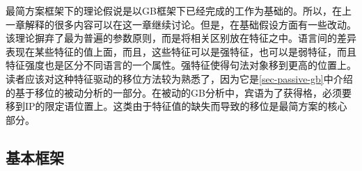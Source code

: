 最简方案框架下的理论假说是以GB框架下已经完成的工作为基础的。所以，在上一章解释的很多内容可以在这一章继续讨论。但是，在基础假设方面有一些改动。该理论摒弃了最为普遍的参数原则，而是将相关区别放在特征之中。语言间的差异表现在某些特征的值上面，而且，这些特征可以是强特征，也可以是弱特征，而且特征强度也是区分不同语言的一个属性。强特征使得句法对象移到更高的位置上。读者应该对这种特征驱动的移位方法较为熟悉了，因为它是\ref{sec-passive-gb}中介绍的基于移位的被动分析的一部分。在被动的GB分析中，宾语为了获得格，必须要移到IP的限定语位置上。这类由于特征值的缺失而导致的移位是最简方案的核心部分。

\subsection{基本框架}

